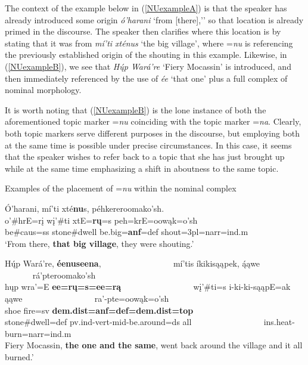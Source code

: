 The context of the example below in (\ref{NUexampleA}) is that the speaker has already introduced some origin \textit{ó'harani} `from [there],'' so that location is already primed in the discourse. The speaker then clarifies where this location is by stating that it was from \textit{mí'ti xténus} `the big village', where =\textit{nu} is referencing the previously established origin of the shouting in this example. Likewise, in (\ref{NUexampleB}), we see that \textit{Hų́p Wará're} `Fiery Mocassin' is introduced, and then immediately referenced by the use of \textit{ée} `that one' plus a full complex of nominal morphology.

It is worth noting that (\ref{NUexampleB}) is the lone instance of both the aforementioned topic marker =\textit{nu} coinciding with the topic marker =\textit{na}. Clearly, both topic markers serve different purposes in the discourse, but employing both at the same time is possible under precise circumstances. In this case, it seems that the speaker wishes to refer back to a topic that she has just brought up while at the same time emphasizing a shift in aboutness to the same topic.


\begin{exe}
    \item\label{NUexample} Examples of the placement of =\textit{nu} within the nominal complex

    \begin{xlist}

    \item\label{NUexampleA} \glll Ó'harani, mí'ti xté\textbf{nu}s, péhkereroomako'sh.\\
    o'\#hrE=rį wį'\#ti xtE=\textbf{rų}=s peh=krE=oowąk=o'sh\\
    \textnormal{be}\#caus=ss \textnormal{stone}\#\textnormal{dwell} \textnormal{be.big}=\textbf{anf}=def \textnormal{shout}=3pl=narr=ind.m\\
    \glt `From there, \textbf{that big village}, they were shouting.' \citep[107]{hollow1973b}

    \item\label{NUexampleB} \glll Hų́p Wará're, \textbf{éenuseena}, ~ ~ ~ ~ ~ ~ ~ ~ ~ ~ mí'tis íkikisąąpek, ą́ąwe ~ ~ ~ ~ ~ ~ ~ ~ ~ ~ rá'pteroomako'sh\\ 
    hųp wra'=E \textbf{ee=rų=s=ee=rą} ~ ~ ~ ~ ~ ~ ~ ~ ~ ~ wį'\#ti=s i-ki-ki-sąąpE=ak ąąwe ~ ~ ~ ~ ~ ~ ~ ~ ~ ~ ra'-pte=oowąk=o'sh\\
    \textnormal{shoe} \textnormal{fire}=sv \textbf{dem.dist=anf=def=dem.dist=top} ~ ~ ~ ~ ~ ~ ~ ~ ~ ~ \textnormal{stone}\#\textnormal{dwell}=def  pv.ind-vert-mid-\textnormal{be.around}=ds \textnormal{all} ~ ~ ~ ~ ~ ~ ~ ~ ~ ~ ins.heat-\textnormal{burn}=narr=ind.m\\
    \glt Fiery Mocassin, \textbf{the one and the same}, went back around the village and it all burned.' \citep[155]{hollow1973a}

    \end{xlist}

\end{exe}


